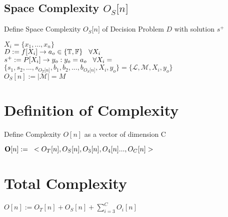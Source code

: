 \documentclass[11pt]{article}
\begin{document}
\subsection{Space Complexity $O_S \lbrack n \rbrack$}
Define Space Complexity $O_S \lbrack n \rbrack$ of Decision Problem $D$ with solution $s^+$
\begin{center}
$
X_i = \{x_1,...,x_n\}
$
\\ \vspace{2mm}
$
D := f \lbrack X_i \rbrack \rightarrow a_{o} \in \{\mathbb{T}, \mathbb{F}\} \hspace{3mm} \forall X_i
$
\\ \vspace{2mm}
$
s^+ := P \lbrack X_i \rbrack \rightarrow y_{o} : y_o = a_{o} \hspace{3mm} \forall X_i =
$
\\ \vspace{2mm}
$
\{ s_1,s_2,...,s_{O_T \lbrack n \rbrack }, b_1, b_2,...,b_{O_S \lbrack n \rbrack},X_i,y_o \} = \{ \mathcal{L},\mathcal{M},X_i,y_o\}
$
\\ \vspace{2mm}
$
O_S[n] := |\mathcal{M}| = M
$
\end{center}





\section{Definition of Complexity}
Define Complexity $O[n]$ as a vector of dimension C
\begin{center}
$
\bold{O}[n] := \hspace{3mm} < O_T [n], O_S [n],O_3[n],O_4[n]...,O_C[n]>
$
\end{center}

\section{Total Complexity}
\begin{center}
$O[n] := O_T[n] + O_S[n] + \sum_{i=3}^{C} O_i[n]$
\end{center}
\end{document}
